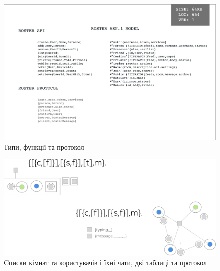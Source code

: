 \documentclass[11pt,oneside]{article}
\begin{document}
\begin{figure}[h!]
\centering
\includegraphics[scale=0.1]{img/exe-roster-api}
\caption{Типи, функції та протокол}
\end{figure}

\begin{figure}[h!]
\centering
\includegraphics[scale=0.3]{img/exe-roster}
\caption{Cписки кімнат та користувачів і їхні чати, дві таблиці та протокол}
\end{figure}
\end{document}
